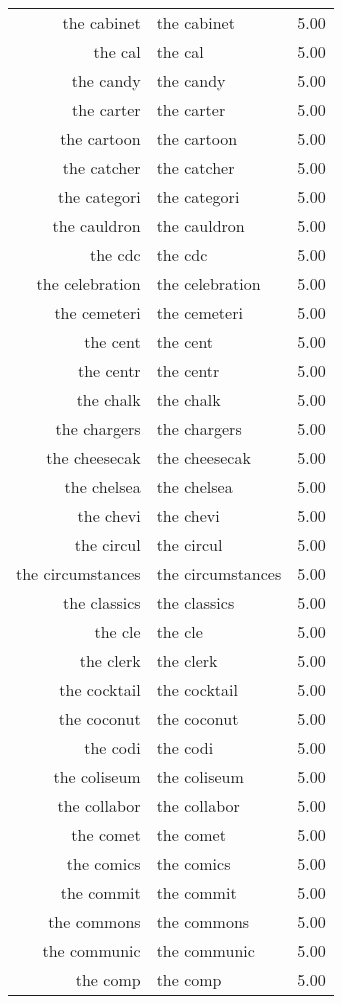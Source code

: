 \begin{table}[ht]
\begin{tabular}{rlr}
  the cabinet & the cabinet & 5.00 \\ 
  the cal & the cal & 5.00 \\ 
  the candy & the candy & 5.00 \\ 
  the carter & the carter & 5.00 \\ 
  the cartoon & the cartoon & 5.00 \\ 
  the catcher & the catcher & 5.00 \\ 
  the categori & the categori & 5.00 \\ 
  the cauldron & the cauldron & 5.00 \\ 
  the cdc & the cdc & 5.00 \\ 
  the celebration & the celebration & 5.00 \\ 
  the cemeteri & the cemeteri & 5.00 \\ 
  the cent & the cent & 5.00 \\ 
  the centr & the centr & 5.00 \\ 
  the chalk & the chalk & 5.00 \\ 
  the chargers & the chargers & 5.00 \\ 
  the cheesecak & the cheesecak & 5.00 \\ 
  the chelsea & the chelsea & 5.00 \\ 
  the chevi & the chevi & 5.00 \\ 
  the circul & the circul & 5.00 \\ 
  the circumstances & the circumstances & 5.00 \\ 
  the classics & the classics & 5.00 \\ 
  the cle & the cle & 5.00 \\ 
  the clerk & the clerk & 5.00 \\ 
  the cocktail & the cocktail & 5.00 \\ 
  the coconut & the coconut & 5.00 \\ 
  the codi & the codi & 5.00 \\ 
  the coliseum & the coliseum & 5.00 \\ 
  the collabor & the collabor & 5.00 \\ 
  the comet & the comet & 5.00 \\ 
  the comics & the comics & 5.00 \\ 
  the commit & the commit & 5.00 \\ 
  the commons & the commons & 5.00 \\ 
  the communic & the communic & 5.00 \\ 
  the comp & the comp & 5.00 \\ 

\end{tabular}
\end{table}
